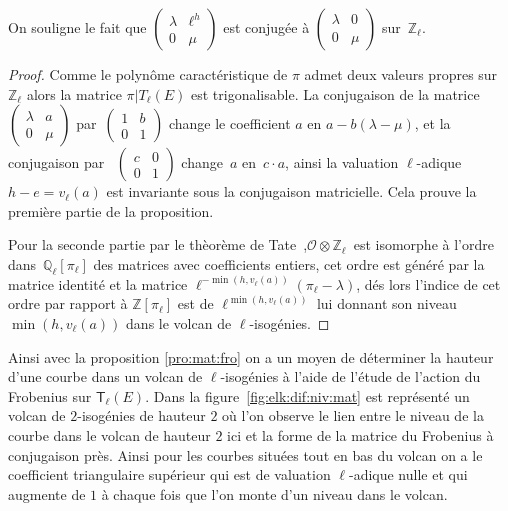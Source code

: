 \documentclass[10pt,a4paper]{book}
\theoremstyle{plain}
\theoremstyle{definition}
\theoremstyle{definition}
\theoremstyle{definition}
\theoremstyle{definition}
\theoremstyle{remark}
\theoremstyle{remark}
\theoremstyle{definition}
\begin{document}
On souligne le fait que $\left(\begin{smallmatrix} \lambda & \ell^h \\ 0 &
\mu \end{smallmatrix}\right)$ est conjugée à $\left(\begin{smallmatrix} \lambda & 0 \\ 0 & \mu\end{smallmatrix}\right)$ sur~$\mathbb{Z}_{\ell}$.
\begin{proof}
Comme le polynôme caractéristique de $\pi$ admet deux valeurs propres sur 
$\mathbb{Z}_{\ell}$ alors la matrice $\pi|T_{\ell}(E)$ est trigonalisable. 
La conjugaison de la matrice $\left ( \begin{smallmatrix}\lambda & a\\0 & \mu
\end{smallmatrix}\right )$ par~$\left ( \begin{smallmatrix}1 & b\\0 & 1
\end{smallmatrix} \right )$ change le coefficient $a$ en $a-b (\lambda - \mu)$, 
et la conjugaison par ~$\left(\begin{smallmatrix} c & 0 \\ 0 &
1\end{smallmatrix}\right)$ change~$a$ en~$c \cdot a$,
ainsi la valuation $\ell$-adique~$h-e = v_{\ell}(a)$ est invariante sous la 
conjugaison matricielle. Cela prouve la première partie de la proposition. 

Pour la seconde partie par le thèorème de 
Tate~\cite[Isogeny theorem III.7.7 (a)]{Silv1},$\mathcal{O} \otimes 
\mathbb{Z}_{\ell}$~est isomorphe à l'ordre dans~$\mathbb{Q}_{\ell}[\pi_{\ell}]$
des matrices avec coefficients entiers, cet ordre est généré par la matrice 
identité et la matrice $\ell^{-\min (h, v_\ell(a))} (\pi_{\ell}-\lambda)$, dés 
lors l'indice de cet ordre par rapport à $\mathbb{Z}[\pi_{\ell}]$ est de 
$\ell^{\min (h, v_\ell(a))}$ lui donnant son niveau $\min (h, v_\ell(a))$ dans 
le volcan de $\ell$-isogénies.
\end{proof}

Ainsi avec la proposition \ref{pro:mat:fro} on a un moyen de déterminer la 
hauteur d'une courbe dans un volcan de $\ell$-isogénies à l'aide de l'étude de 
l'action du Frobenius sur $\mathsf{T}_{\ell}(E)$. Dans la 
figure~\ref{fig:elk:dif:niv:mat} est représenté un volcan de $2$-isogénies 
de hauteur $2$ où l'on observe le lien entre le niveau de la courbe dans le 
volcan de hauteur $2$ ici et la forme de la matrice du Frobenius à conjugaison 
près. Ainsi pour les courbes situées tout en bas du volcan on a le coefficient 
triangulaire supérieur qui est de valuation $\ell$-adique nulle et qui augmente
de $1$ à chaque fois que l'on monte d'un niveau dans le volcan. 
\end{document}
